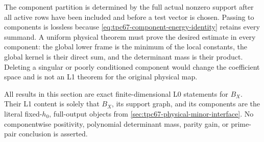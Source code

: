 \begin{remark}
\label{rem:tpc67-no-component-deletion}
The component partition is determined by the full actual nonzero support
after all active rows have been included and before a test vector is
chosen.  Passing to components is lossless because
\eqref{eq:tpc67-component-energy-identity} retains every summand.  A
uniform physical theorem must prove the desired estimate in every
component: the global lower frame is the minimum of the local constants,
the global kernel is their direct sum, and the determinant mass is their
product.  Deleting a singular or poorly conditioned component would
change the coefficient space and is not an L1 theorem for the original
physical map.

All results in this section are exact finite-dimensional L0 statements
for \(B_X\).  Their L1 content is solely that \(B_X\), its support graph,
and its components are the literal fixed-\(h_0\), full-output objects
from \cref{sec:tpc67-physical-minor-interface}.  No componentwise
positivity, polynomial determinant mass, parity gain, or prime-pair
conclusion is asserted.
\end{remark}
